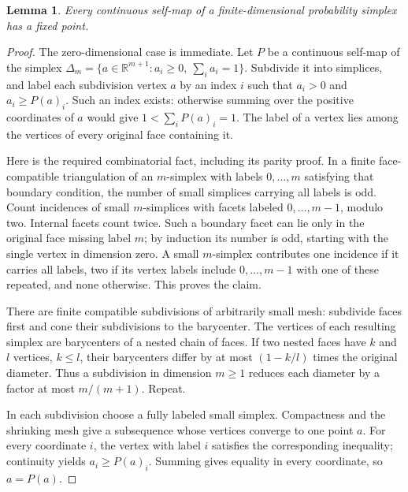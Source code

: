 \documentclass[11pt]{article}
\newtheorem{lemma}[theorem]{Lemma}
\theoremstyle{remark}
\newcommand{\R}{\mathbb R}
\newcommand{\needroom}[1]{%
  \par\ifdim\dimexpr\pagegoal-\pagetotal\relax<#1\relax\newpage\fi}
\begin{document}
\needroom{6\baselineskip}
\begin{lemma}\label{lem:simplex}
Every continuous self-map of a finite-dimensional probability simplex has a fixed point.
\end{lemma}
\begin{proof}
The zero-dimensional case is immediate. Let $P$ be a continuous self-map of the simplex
$\Delta_m=\{a\in\R^{m+1}:a_i\ge0,\ \sum_i a_i=1\}$.
Subdivide it into simplices, and label each subdivision vertex $a$ by an index $i$ such that $a_i>0$ and $a_i\ge P(a)_i$. Such an index exists: otherwise summing over the positive coordinates of $a$ would give $1<\sum_i P(a)_i=1$. The label of a vertex lies among the vertices of every original face containing it.

Here is the required combinatorial fact, including its parity proof. In a finite face-compatible triangulation of an $m$-simplex with labels $0,\ldots,m$ satisfying that boundary condition, the number of small simplices carrying all labels is odd. Count incidences of small $m$-simplices with facets labeled $0,\ldots,m-1$, modulo two. Internal facets count twice. Such a boundary facet can lie only in the original face missing label $m$; by induction its number is odd, starting with the single vertex in dimension zero. A small $m$-simplex contributes one incidence if it carries all labels, two if its vertex labels include $0,\ldots,m-1$ with one of these repeated, and none otherwise. This proves the claim.

There are finite compatible subdivisions of arbitrarily small mesh: subdivide faces first and cone their subdivisions to the barycenter. The vertices of each resulting simplex are barycenters of a nested chain of faces. If two nested faces have $k$ and $l$ vertices, $k\le l$, their barycenters differ by at most $(1-k/l)$ times the original diameter. Thus a subdivision in dimension $m\ge1$ reduces each diameter by a factor at most $m/(m+1)$. Repeat.

In each subdivision choose a fully labeled small simplex. Compactness and the shrinking mesh give a subsequence whose vertices converge to one point $a$. For every coordinate $i$, the vertex with label $i$ satisfies the corresponding inequality; continuity yields $a_i\ge P(a)_i$. Summing gives equality in every coordinate, so $a=P(a)$.
\end{proof}
\end{document}
